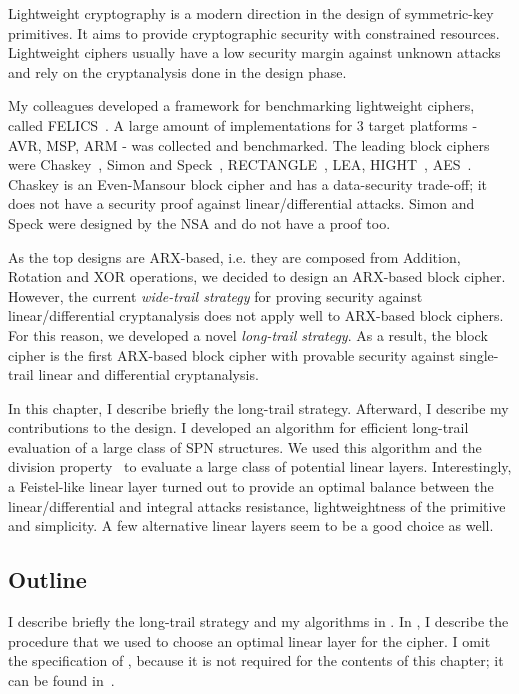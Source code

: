 
Lightweight cryptography is a modern direction in the design of symmetric-key primitives. It aims to provide cryptographic security with constrained resources. Lightweight ciphers usually have a low security margin against unknown attacks and rely on the cryptanalysis done in the design phase.

My colleagues developed a framework for benchmarking lightweight ciphers, called FELICS~\cite{Felics,Felics1,Felics2}. A large amount of implementations for 3 target platforms - AVR, MSP, ARM - was collected and benchmarked. The leading block ciphers were Chaskey~\cite{Chaskey}, Simon and Speck~\cite{Simon}, RECTANGLE~\cite{RECTANGLE}, LEA\cite{LEA}, HIGHT~\cite{HIGHT}, AES~\cite{AES}. Chaskey is an Even-Mansour block cipher and has a data-security trade-off; it does not have a security proof against linear/differential attacks. Simon and Speck were designed by the NSA and do not have a proof too. 

As the top designs are ARX-based, i.e. they are composed from Addition, Rotation and XOR operations, we decided to design an ARX-based block cipher. However, the current \emph{wide-trail strategy} for proving security against linear/differential cryptanalysis does not apply well to ARX-based block ciphers. For this reason, we developed a novel \emph{long-trail strategy}. As a result, the block cipher \sparx{} is the first ARX-based block cipher with provable security against single-trail linear and differential cryptanalysis.

In this chapter, I describe briefly the long-trail strategy.
Afterward, I describe my contributions to the design. I developed an algorithm for efficient long-trail evaluation of a large class of SPN structures. We used this algorithm and the division property~\cite{division} to evaluate a large class of potential linear layers. Interestingly, a Feistel-like linear layer turned out to provide an optimal balance between the linear/differential and integral attacks resistance, lightweightness of the primitive and simplicity. A few alternative linear layers seem to be a good choice as well.

\subsection{Outline}
I describe briefly the long-trail strategy and my algorithms in . In , I describe the procedure that we used to choose an optimal linear layer for the cipher.
I omit the specification of \sparx{}, because it is not required for the contents of this chapter; it can be found in~\cite{OurSPARX}.